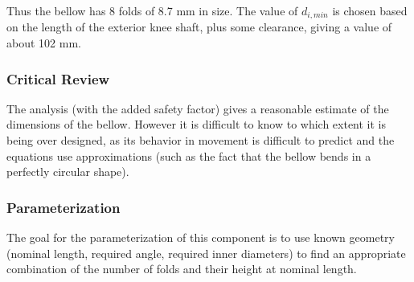 Thus the bellow has 8 folds of 8.7 mm in size. The value of $d_{i,min}$ is chosen based on the length of the exterior knee shaft, plus some clearance, giving a value of about 102 mm.



\subsubsection{Critical Review}
The analysis (with the added safety factor) gives a reasonable estimate of the dimensions of the bellow. However it is difficult to know to which extent it is being over designed, as its behavior in movement is difficult to predict and the equations use approximations (such as the fact that the bellow bends in a perfectly circular shape).


\subsubsection{Parameterization}
The goal for the parameterization of this component is to use known geometry (nominal length, required angle, required inner diameters) to find an appropriate combination of the number of folds and their height at nominal length.